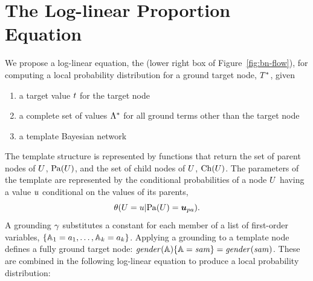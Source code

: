 \documentclass[runningheads,a4paper]{llncs}
\begin{document}
\section{The Log-linear Proportion Equation} 
\label{sec:theequation}
We propose a log-linear equation, the  (lower right box of Figure~\ref{fig:bn-flow}), for computing a local probability distribution for a ground target node, $T^{*}\hspace{0.0ex}$, given 

\begin{enumerate}
\item a target value $t$ for the target node
\item a complete set of values $\Lambda^{*}\hspace{0.0ex}$  for all ground terms other than the target node
\item a template Bayesian network
\end{enumerate}

The template structure is represented by functions that return the set of parent nodes of $U$, $\mathrm{Pa}(U)$, and the set of child nodes of $U$, $\mathrm{Ch}(U)$. The parameters of the template are
represented by the conditional probabilities of a node $U$ having a value $u$ conditional on the values of its parents, $$\cprob{\UT = \UV}{\Pa{\UT} = \Prange{\UT}}.$$ A grounding $\gamma$ substitutes a constant for each member of a list of first-order variables, $\{\mathbb{A}_{1} = a_{1},\ldots, \mathbb{A}_{k} = a_{k}\}$. Applying a grounding to a template node defines a fully ground target node: $\it{gender}(\mathbb{A}) \{\mathbb{A} = sam\} = \it{gender}(sam)$.  These are combined in the following log-linear equation to produce a local probability distribution:
\end{document}
